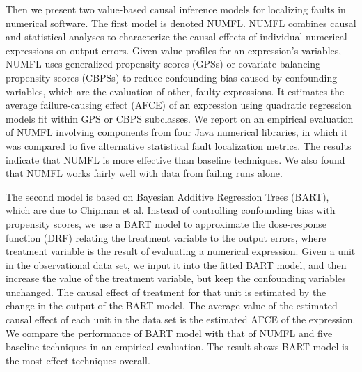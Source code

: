 Then we present two value-based causal inference models for localizing faults in numerical software. The first model is denoted NUMFL. NUMFL combines causal and statistical analyses to characterize the causal effects of individual numerical expressions on output errors.  Given value-profiles for an expression's variables, NUMFL uses generalized propensity scores (GPSs) or covariate balancing propensity scores (CBPSs) to reduce confounding bias caused by confounding variables, which are the evaluation of other, faulty expressions.  It estimates the average failure-causing effect (AFCE) of an expression using quadratic regression models fit within GPS or CBPS subclasses.  We report on an empirical evaluation of NUMFL involving components from four Java numerical libraries, in which it was compared to five alternative statistical fault localization metrics.  The results indicate that NUMFL is more effective than baseline techniques. We also found that NUMFL works fairly well with data from failing runs alone.
 
The second model is based on Bayesian Additive Regression Trees (BART), which are due to Chipman et al. Instead of controlling confounding bias with propensity scores, we use a BART model to approximate the dose-response function (DRF) relating the treatment variable to the output errors, where treatment variable is the result of evaluating a numerical expression. Given a unit in the observational data set, we input it into the fitted BART model, and then increase the value of the treatment variable, but keep the confounding variables unchanged. The causal effect of treatment for that unit is estimated by the change in the output of the BART model. The average value of the estimated causal effect of each unit in the data set is the estimated AFCE of the expression. We compare the performance of BART model with that of NUMFL and five baseline techniques in an empirical evaluation. The result shows BART model is the most effect techniques overall.  




